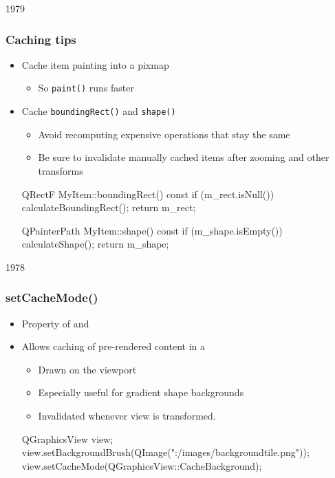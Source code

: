 \begin{slide}[fragile]{1979}


\frametitle{Caching tips}
\begin{itemize}
\item Cache item painting into a pixmap
    \begin{itemize}
    \item So \texttt{paint()} runs faster
    \end{itemize}
\item Cache \texttt{boundingRect()} and \texttt{shape()}
    \begin{itemize}
    \item Avoid recomputing expensive operations that stay the same
    \item Be sure to invalidate manually cached items after zooming and other transforms
    \end{itemize}
\begin{cpp}
QRectF MyItem::boundingRect() const {
    if (m_rect.isNull()) calculateBoundingRect();
    return m_rect;
}

QPainterPath MyItem::shape() const {
    if (m_shape.isEmpty()) calculateShape();
    return m_shape;
}
\end{cpp}
\end{itemize}
\end{slide}


\begin{slide}[fragile]{1978}


\frametitle{setCacheMode()}
\begin{itemize}
\item Property of  and 

\item Allows caching of pre-rendered content in a 

    \begin{itemize}
    \item Drawn on the viewport
    \item Especially useful for gradient shape backgrounds
    \item Invalidated whenever view is transformed.
    \end{itemize}
\begin{cpp}
 QGraphicsView view;
 view.setBackgroundBrush(QImage(":/images/backgroundtile.png"));
 view.setCacheMode(QGraphicsView::CacheBackground);
\end{cpp}
\end{itemize}
\end{slide}




